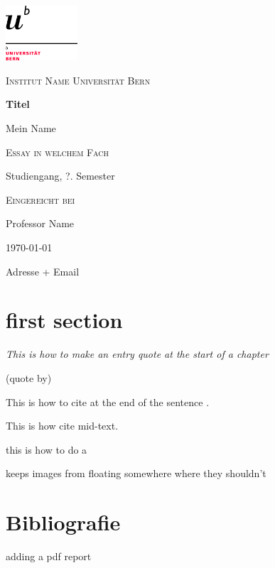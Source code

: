 \documentclass[12pt,a4paper]{article}
\author{Silvia Götti}
\begin{document}
\begin{titlepage}

\centering
	\includegraphics[width=0.2\textwidth]{logo_unibern@2x.png}
	\vfill
	{\scshape\LARGE Institut Name Universität Bern \par}
	\vspace{1cm}	
	{\huge\bfseries Titel\par}
	\vspace{2cm}
	{\Large Mein Name\par}	
	\vspace{1cm}
	{\scshape Essay in welchem Fach\par}
	{Studiengang, ?. Semester\par}
	\vspace{1.5cm}
	
	{\scshape Eingereicht bei\par}
	Professor Name

	
	{\today\par}
	\vfill
	Adresse + Email


\end{titlepage}

\tableofcontents

\newpage
{}

\section{first section}

\epigraph{\textit{This is how to make an entry quote at the start of a chapter}}{(quote by)}

This is how to cite at the end of the sentence \citep[S.23]{richter_altsteinzeit_2018}.

This is how \citet{berg_weltkulturerbe_2018} cite mid-text.

this is how to do a 

\FloatBarrier keeps images from floating somewhere where they shouldn't

\newpage

\section{Bibliografie}

%
\renewcommand{\harvardurl}[1]{\url{#1}}

adding a pdf report

%
\end{document}
